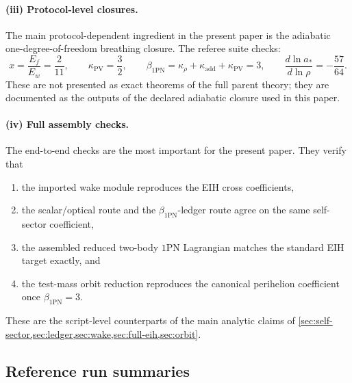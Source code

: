 \documentclass[11pt]{article}
\newcommand{\kadd}{\kappa_{\mathrm{add}}}
\newcommand{\kPV}{\kappa_{\mathrm{PV}}}
\newcommand{\krho}{\kappa_{\rho}}
\newcommand{\betaPN}{\beta_{\mathrm{1PN}}}
\begin{document}
\paragraph{(iii) Protocol-level closures.}
The main protocol-dependent ingredient in the present paper is the adiabatic
one-degree-of-freedom breathing closure. The referee suite checks:
\begin{equation}
x=\frac{E_f}{E_w}=\frac{2}{11},
\qquad
\kPV=\frac32,
\qquad
\betaPN=\krho+\kadd+\kPV=3,
\qquad
\frac{d\ln a_*}{d\ln \rho}=-\frac{57}{64}.
\label{eq:verification-protocol-checks}
\end{equation}
These are not presented as exact theorems of the full parent theory; they are documented as
the outputs of the declared adiabatic closure used in this paper.

\paragraph{(iv) Full assembly checks.}
The end-to-end checks are the most important for the present paper. They verify that
\begin{enumerate}[leftmargin=1.5em]
  \item the imported wake module reproduces the EIH cross coefficients,
  \item the scalar/optical route and the \(\betaPN\)-ledger route agree on the same
  self-sector coefficient,
  \item the assembled reduced two-body \(1\)PN Lagrangian matches the standard EIH target
  exactly, and
  \item the test-mass orbit reduction reproduces the canonical perihelion coefficient once
  \(\betaPN=3\).
\end{enumerate}
These are the script-level counterparts of the main analytic claims of
\cref{sec:self-sector,sec:ledger,sec:wake,sec:full-eih,sec:orbit}.

\subsection{Reference run summaries}
\label{sec:verification-summaries}
\end{document}
